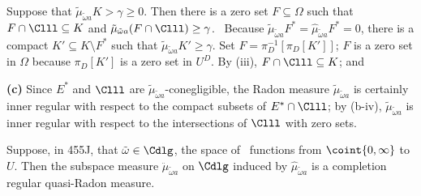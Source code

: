 {\medskip

 Suppose that $\tilde\mu_{\tilde\omega a}K>\gamma\ge 0$.
Then there is a
zero set $F\subseteq\Omega$ such that $F\cap\Clll\subseteq K$ and
$\tilde\mu_{\tilde\omega a}(F\cap\Clll)\ge\gamma$.   \Prf\ Because
$\tilde\mu_{\tilde\omega a}F^*=\hat\mu_{\tilde\omega a}F^*=0$,
there is a compact
$K'\subseteq K\setminus F^*$ such that
$\tilde\mu_{\tilde\omega a}K'\ge\gamma$.
Set $F=\pi_D^{-1}[\pi_D[K']]$;  $F$ is a zero set in $\Omega$ because
$\pi_D[K']$ is a zero set in $U^D$.   By (iii),
$F\cap\Clll\subseteq K$;  and


\medskip

{\bf (c)} Since $E^*$ and $\Clll$ are
$\tilde\mu_{\tilde\omega a}$-conegligible, the Radon measure
$\tilde\mu_{\tilde\omega a}$ is certainly inner regular with respect to the
compact subsets of $E^*\cap\Clll$;   by (b-iv), $\tilde\mu_{\tilde\omega a}$
is inner regular with respect to the
intersections of $\Clll$ with zero sets.
}%

 Suppose, in 455J, that $\tilde\omega\in\Cdlg$,
the space of \cadlag\ functions from $\coint{0,\infty}$ to $U$.
Then the subspace measure $\ddot\mu_{\tilde\omega a}$
on $\Cdlg$ induced by $\hat\mu_{\tilde\omega a}$ is a completion regular
quasi-Radon measure.

